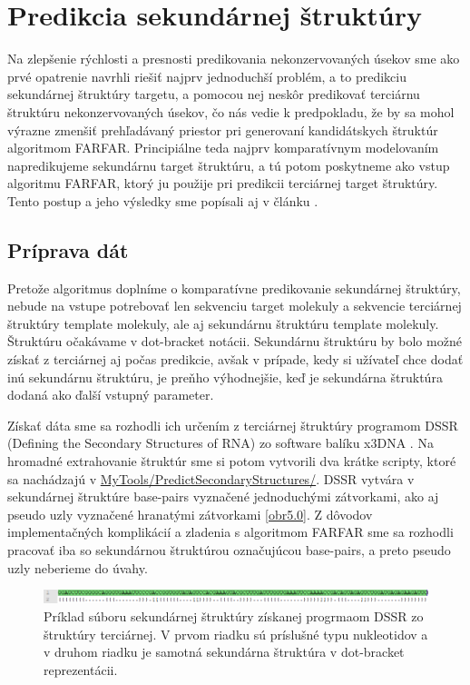 \chapter{Predikcia sekundárnej štruktúry}

Na zlepšenie rýchlosti a presnosti predikovania nekonzervovaných úsekov sme ako prvé opatrenie navrhli riešiť najprv jednoduchší problém, a to predikciu sekundárnej štruktúry targetu, a pomocou nej neskôr predikovať terciárnu štruktúru nekonzervovaných úsekov, čo nás vedie k predpokladu, že by sa mohol výrazne zmenšiť prehľadávaný priestor pri generovaní kandidátskych štruktúr algoritmom FARFAR. Principiálne teda najprv komparatívnym modelovaním napredikujeme sekundárnu target štruktúru, a tú potom poskytneme ako vstup algoritmu FARFAR, ktorý ju použije pri predikcii terciárnej target štruktúry. Tento postup a jeho výsledky sme popísali aj v článku \cite{8218009}.

\section{Príprava dát}
Pretože algoritmus doplníme o komparatívne predikovanie sekundárnej štruktúry, nebude na vstupe potrebovať len sekvenciu target molekuly a sekvencie terciárnej štruktúry template molekuly, ale aj sekundárnu štruktúru template molekuly. Štruktúru očakávame v dot-bracket notácii. Sekundárnu štruktúru by bolo možné získať z terciárnej aj počas predikcie, avšak v prípade, kedy si užívateľ chce dodať inú sekundárnu štruktúru, je preňho výhodnejšie, keď je sekundárna štruktúra dodaná ako ďalší vstupný parameter.


\indent Získať dáta sme sa rozhodli ich určením z terciárnej štruktúry programom DSSR (Defining the Secondary Structures of RNA) zo software balíku x3DNA \cite{x3dna}. Na hromadné extrahovanie štruktúr sme si potom vytvorili dva krátke scripty, ktoré sa nachádzajú v \url{MyTools/PredictSecondaryStructures/}. DSSR vytvára v sekundárnej štruktúre base-pairs vyznačené jednoduchými zátvorkami, ako aj pseudo uzly vyznačené hranatými zátvorkami \autoref{obr5.0}. Z dôvodov implementačných komplikácií a zladenia s algoritmom FARFAR sme sa rozhodli pracovať iba so sekundárnou štruktúrou označujúcou base-pairs, a preto pseudo uzly neberieme do úvahy.
\begin{figure}%
\includegraphics[width=\textwidth]{../img/dssr}
\caption{Príklad súboru sekundárnej štruktúry získanej progrmaom DSSR zo štruktúry terciárnej. V prvom riadku sú príslušné typu nukleotidov a v druhom riadku je samotná sekundárna štruktúra v  dot-bracket reprezentácii.}
\label{obr5.0}
\end{figure}

